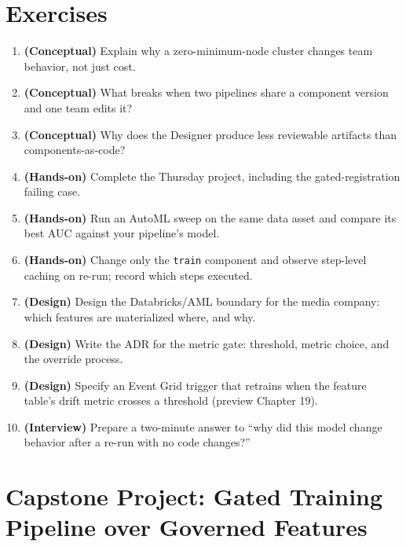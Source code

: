 \section{Exercises}
\begin{enumerate}
    \item \textbf{(Conceptual)} Explain why a zero-minimum-node cluster changes team behavior, not just cost.
    \item \textbf{(Conceptual)} What breaks when two pipelines share a component version and one team edits it?
    \item \textbf{(Conceptual)} Why does the Designer produce less reviewable artifacts than components-as-code?
    \item \textbf{(Hands-on)} Complete the Thursday project, including the gated-registration failing case.
    \item \textbf{(Hands-on)} Run an AutoML sweep on the same data asset and compare its best AUC against your pipeline's model.
    \item \textbf{(Hands-on)} Change only the \texttt{train} component and observe step-level caching on re-run; record which steps executed.
    \item \textbf{(Design)} Design the Databricks/AML boundary for the media company: which features are materialized where, and why.
    \item \textbf{(Design)} Write the ADR for the metric gate: threshold, metric choice, and the override process.
    \item \textbf{(Design)} Specify an Event Grid trigger that retrains when the feature table's drift metric crosses a threshold (preview Chapter 19).
    \item \textbf{(Interview)} Prepare a two-minute answer to ``why did this model change behavior after a re-run with no code changes?''
\end{enumerate}

\section{Capstone Project: Gated Training Pipeline over Governed Features}\label{sec:ch18-capstone}

